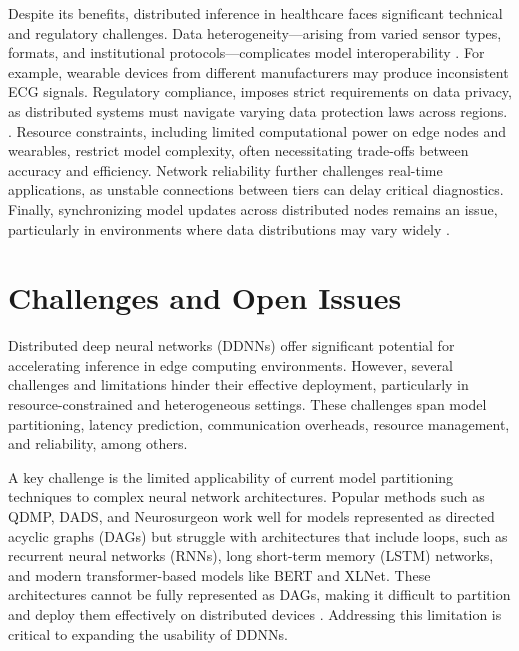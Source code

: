 \documentclass[conference]{IEEEtran}
\begin{document}
Despite its benefits, distributed inference in healthcare faces significant technical and regulatory challenges. Data heterogeneity—arising from varied sensor types, formats, and institutional protocols—complicates model interoperability \cite{akdemir2025technical}. For example, wearable devices from different manufacturers may produce inconsistent ECG signals. Regulatory compliance, imposes strict requirements on data privacy, as distributed systems must navigate varying data protection laws across regions. \cite{akdemir2025technical, tuli2020healthfog}. Resource constraints, including limited computational power on edge nodes and wearables, restrict model complexity, often necessitating trade-offs between accuracy and efficiency. Network reliability further challenges real-time applications, as unstable connections between tiers can delay critical diagnostics. Finally, synchronizing model updates across distributed nodes remains an issue, particularly in environments where data distributions may vary widely \cite{akdemir2025technical, al2022machine}.








\section{Challenges and Open Issues}

Distributed deep neural networks (DDNNs) offer significant potential for accelerating inference in edge computing environments. However, several challenges and limitations hinder their effective deployment, particularly in resource-constrained and heterogeneous settings. These challenges span model partitioning, latency prediction, communication overheads, resource management, and reliability, among others.

A key challenge is the limited applicability of current model partitioning techniques to complex neural network architectures. Popular methods such as QDMP, DADS, and Neurosurgeon work well for models represented as directed acyclic graphs (DAGs) but struggle with architectures that include loops, such as recurrent neural networks (RNNs), long short-term memory (LSTM) networks, and modern transformer-based models like BERT and XLNet. These architectures cannot be fully represented as DAGs, making it difficult to partition and deploy them effectively on distributed devices \cite{zhang2021dynamic, zhao2018deepthings, zhou2021dynamic}. Addressing this limitation is critical to expanding the usability of DDNNs.
\end{document}
